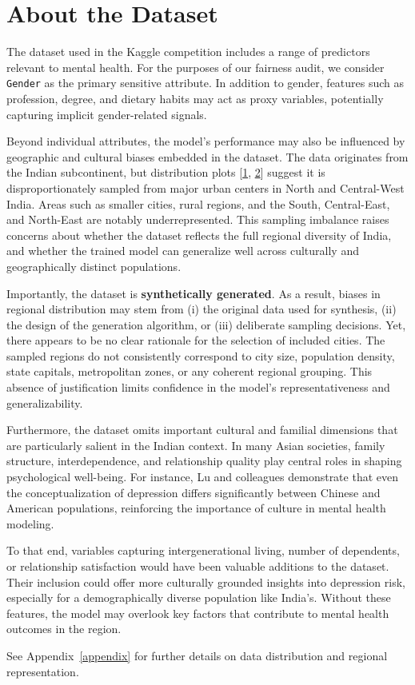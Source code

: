 \chapter{About the Dataset}

The dataset used in the Kaggle competition \parencite{raoDepressionSurveyDataset} includes a range of predictors relevant to mental health. For the purposes of our fairness audit, we consider \texttt{Gender} as the primary sensitive attribute. In addition to gender, features such as profession, degree, and dietary habits may act as proxy variables, potentially capturing implicit gender-related signals.

Beyond individual attributes, the model’s performance may also be influenced by geographic and cultural biases embedded in the dataset. The data originates from the Indian subcontinent, but distribution plots
[\href{https://colab.research.google.com/drive/1V5NlYPUzOfSxUoDHg67yVfatMXSTWNSU?usp=sharing}{1}, \href{https://www.google.com/maps/d/edit?mid=17YtHn2h6j22KFGfMiAvcx5rToAd4Ukw&usp=sharing}{2}] suggest it is disproportionately sampled from major urban centers in North and Central-West India. Areas such as smaller cities, rural regions, and the South, Central-East, and North-East are notably underrepresented. This sampling imbalance raises concerns about whether the dataset reflects the full regional diversity of India, and whether the trained model can generalize well across culturally and geographically distinct populations.

Importantly, the dataset is \textbf{synthetically generated}. As a result, biases in regional distribution may stem from (i) the original data used for synthesis, (ii) the design of the generation algorithm, or (iii) deliberate sampling decisions. Yet, there appears to be no clear rationale for the selection of included cities. The sampled regions do not consistently correspond to city size, population density, state capitals, metropolitan zones, or any coherent regional grouping. This absence of justification limits confidence in the model’s representativeness and generalizability.

Furthermore, the dataset omits important cultural and familial dimensions that are particularly salient in the Indian context. In many Asian societies, family structure, interdependence, and relationship quality play central roles in shaping psychological well-being. For instance, Lu and colleagues \parencite{lu2010understanding} demonstrate that even the conceptualization of depression differs significantly between Chinese and American populations, reinforcing the importance of culture in mental health modeling.

To that end, variables capturing intergenerational living, number of dependents, or relationship satisfaction would have been valuable additions to the dataset. Their inclusion could offer more culturally grounded insights into depression risk, especially for a demographically diverse population like India’s. Without these features, the model may overlook key factors that contribute to mental health outcomes in the region.

See Appendix~\ref{appendix} for further details on data distribution and regional representation.